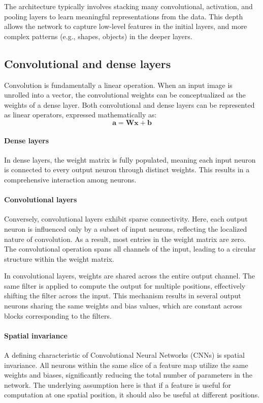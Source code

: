 The architecture typically involves stacking many convolutional, activation, and pooling layers to learn meaningful representations from the data. 
This depth allows the network to capture low-level features in the initial layers, and more complex patterns (e.g., shapes, objects) in the deeper layers.

\subsection{Convolutional and dense layers}
Convolution is fundamentally a linear operation. 
When an input image is unrolled into a vector, the convolutional weights can be conceptualized as the weights of a dense layer.
Both convolutional and dense layers can be represented as linear operators, expressed mathematically as:
\[\mathbf{a}=\mathbf{Wx}+\mathbf{b}\]

\paragraph*{Dense layers}
In dense layers, the weight matrix is fully populated, meaning each input neuron is connected to every output neuron through distinct weights. 
This results in a comprehensive interaction among neurons.

\paragraph*{Convolutional layers}
Conversely, convolutional layers exhibit sparse connectivity. 
Here, each output neuron is influenced only by a subset of input neurons, reflecting the localized nature of convolution.
As a result, most entries in the weight matrix are zero. 
The convolutional operation spans all channels of the input, leading to a circular structure within the weight matrix.

In convolutional layers, weights are shared across the entire output channel. 
The same filter is applied to compute the output for multiple positions, effectively shifting the filter across the input. 
This mechanism results in several output neurons sharing the same weights and bias values, which are constant across blocks corresponding to the filters.

\paragraph*{Spatial invariance}
A defining characteristic of Convolutional Neural Networks (CNNs) is spatial invariance. 
All neurons within the same slice of a feature map utilize the same weights and biases, significantly reducing the total number of parameters in the network. 
The underlying assumption here is that if a feature is useful for computation at one spatial position, it should also be useful at different positions.


